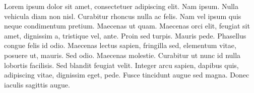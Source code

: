 \preface
Lorem ipsum dolor sit amet, consectetuer adipiscing elit. Nam
ipsum. Nulla vehicula diam non nisl. Curabitur rhoncus nulla ac
felis. Nam vel ipsum quis neque condimentum pretium. Maecenas ut
quam. Maecenas orci elit, feugiat sit amet, dignissim a, tristique
vel, ante. Proin sed turpis. Mauris pede. Phasellus congue felis
id odio. Maecenas lectus sapien, fringilla sed, elementum vitae,
posuere ut, mauris. Sed odio. Maecenas molestie. Curabitur ut nunc
id nulla lobortis facilisis. Sed blandit feugiat velit. Integer
arcu sapien, dapibus quis, adipiscing vitae, dignissim eget, pede.
Fusce tincidunt augue sed magna. Donec iaculis sagittis augue.
